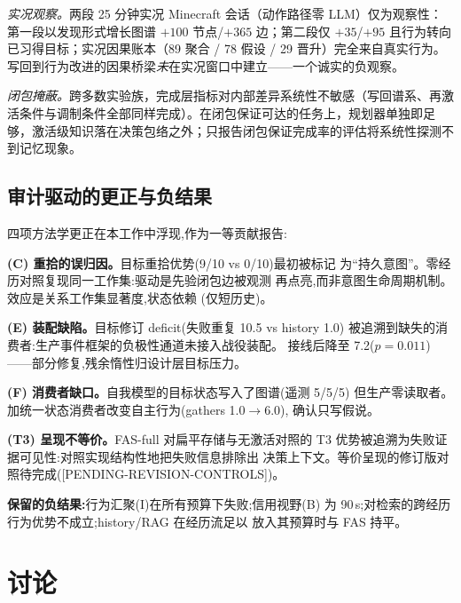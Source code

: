 \documentclass[10pt,a4paper]{ctexart}
\begin{document}
\emph{实况观察。}两段 25 分钟实况 Minecraft 会话（动作路径零 LLM）仅为观察性：第一段以发现形式增长图谱 $+100$ 节点/$+365$ 边；第二段仅 $+35$/$+95$ 且行为转向已习得目标；实况因果账本（89 聚合 / 78 假设 / 29 晋升）完全来自真实行为。写回到行为改进的因果桥梁\emph{未}在实况窗口中建立——一个诚实的负观察。

\emph{闭包掩蔽。}跨多数实验族，完成层指标对内部差异系统性不敏感（写回谱系、再激活条件与调制条件全部同样完成）。在闭包保证可达的任务上，规划器单独即足够，激活级知识落在决策包络之外；只报告闭包保证完成率的评估将系统性探测不到记忆现象。

\subsection{审计驱动的更正与负结果}
\label{sec:audit-negative}

四项方法学更正在本工作中浮现,作为一等贡献报告:

\textbf{(C) 重拾的误归因。}目标重拾优势(9/10 vs 0/10)最初被标记
为``持久意图''。零经历对照复现同一工作集:驱动是先验闭包边被观测
再点亮,而非意图生命周期机制。效应是关系工作集显著度,状态依赖
(仅短历史)。

\textbf{(E) 装配缺陷。}目标修订 deficit(失败重复 10.5 vs history 1.0)
被追溯到缺失的消费者:生产事件框架的负极性通道未接入战役装配。
接线后降至 7.2($p{=}0.011$)——部分修复,残余惰性归设计层目标压力。

\textbf{(F) 消费者缺口。}自我模型的目标状态写入了图谱(遥测 5/5/5)
但生产零读取者。加统一状态消费者改变自主行为(gathers 1.0$\rightarrow$6.0),
确认只写假说。

\textbf{(T3) 呈现不等价。}FAS-full 对扁平存储与无激活对照的 T3
优势被追溯为失败证据可见性:对照实现结构性地把失败信息排除出
决策上下文。等价呈现的修订版对照待完成([PENDING-REVISION-CONTROLS])。

\textbf{保留的负结果:}行为汇聚(I)在所有预算下失败;信用视野(B)
为 90\,s;对检索的跨经历行为优势不成立;history/RAG 在经历流足以
放入其预算时与 FAS 持平。

\section{讨论}
\label{sec:discussion}
\end{document}
